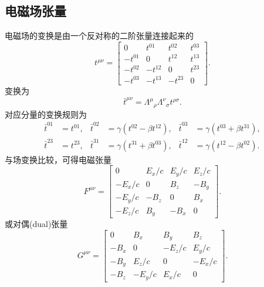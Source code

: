 \subsection{电磁场张量}
电磁场的变换是由一个反对称的二阶张量连接起来的
\[
    t^{\mu\nu} =
    \begin{bmatrix}
        0&t^{01}&t^{02}&t^{03}\\
        -t^{01}&0&t^{12}&t^{13}\\
        -t^{02}&-t^{12}&0&t^{23}\\
        -t^{03}&-t^{13}&-t^{23}&0
    \end{bmatrix}.
\]
变换为 
\[
    \bar t^{\mu\nu} = \Lambda^\mu{}_\rho\Lambda^\nu{}_\sigma t^{\rho\sigma}.
\]
对应分量的变换规则为
\begin{align*}
    \bar t^{01} &= t^{01},&\bar t^{02} &= \gamma(t^{02} - \beta t^{12}),&\bar t^{03} &= \gamma(t^{03} + \beta t^{31}),\\
    \bar t^{23} &= t^{23},&\bar t^{31} &= \gamma(t^{31} + \beta t^{03}),&\bar t^{12} &= \gamma(t^{12} - \beta t^{02}).
\end{align*}
与场变换比较，可得电磁张量
\begin{equation}
    F^{\mu\nu} =
    \begin{bmatrix}
        0&E_x/c&E_y/c&E_z/c\\
        -E_x/c&0&B_z&-B_y\\
        -E_y/c&-B_z&0&B_x\\
        -E_z/c&B_y&-B_x&0
    \end{bmatrix}.
\end{equation}
或对偶(dual)张量
\begin{equation}
    G^{\mu\nu} =
    \begin{bmatrix}
        0&B_x&B_y&B_z\\
        -B_x&0&-E_z/c&E_y/c\\
        -B_y&E_z/c&0&-E_x/c\\
        -B_z&-E_y/c&E_x/c&0
    \end{bmatrix}.
\end{equation}

